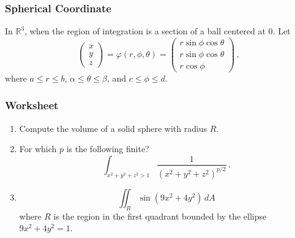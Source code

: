 \documentclass[aspectratio=169]{beamer}
\newcommand{\R}{\mathbb{R}}
\begin{document}
\begin{frame}
    \frametitle{Spherical Coordinate}
    In $\R^3$, when the region of integration is a section of a ball centered at $0$.
    Let
    \begin{equation*}
        \begin{pmatrix}
            x \\ y \\z
        \end{pmatrix}
        =
        \varphi(r,\phi,\theta) = 
        \begin{pmatrix}
            r\sin\phi\cos\theta\\
            r\sin\phi\cos\theta\\
            r \cos\phi
        \end{pmatrix} \,,
    \end{equation*}
    where $ a \leq r \leq b$, $\alpha \leq \theta \leq \beta$, and 
    $c \leq \phi \leq d$.
\end{frame}

\begin{frame}
    \frametitle{Worksheet}
    \begin{enumerate}
        \item Compute the volume of a solid sphere with radius $R$.
        \item For which $p$ is the following finite?
            \begin{equation*}
                \int_{x^2 + y^2 + z^2 > 1} \frac{1}{(x^2 + y^2 + z^2)^{p/2}} \,.
            \end{equation*}
        \item 
            \begin{equation*}
                \iint_R \sin(9x^2 + 4y^2) \, dA
            \end{equation*}
            where $R$ is the region in the first quadrant bounded
            by the ellipse $9x^2 + 4y^2 = 1$.
    \end{enumerate}
\end{frame}
\end{document}

